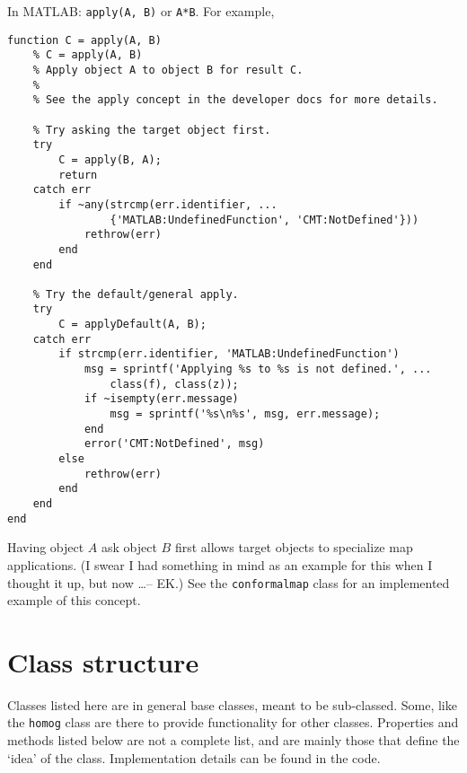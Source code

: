 \documentclass[12pt]{article}
\newcommand{\matlab}{MATLAB}
\begin{document}
\noindent In \matlab: \verb+apply(A, B)+ or \verb+A*B+. For example,
\begin{lstlisting}[frame=single]
function C = apply(A, B)
    % C = apply(A, B)
    % Apply object A to object B for result C.
    %
    % See the apply concept in the developer docs for more details.
    
    % Try asking the target object first.
    try
        C = apply(B, A);
        return
    catch err
        if ~any(strcmp(err.identifier, ...
                {'MATLAB:UndefinedFunction', 'CMT:NotDefined'}))
            rethrow(err)
        end
    end
    
    % Try the default/general apply.
    try
        C = applyDefault(A, B);
    catch err
        if strcmp(err.identifier, 'MATLAB:UndefinedFunction')
            msg = sprintf('Applying %s to %s is not defined.', ...
                class(f), class(z));
            if ~isempty(err.message)
                msg = sprintf('%s\n%s', msg, err.message);
            end
            error('CMT:NotDefined', msg)
        else
            rethrow(err)
        end
    end
end
\end{lstlisting}

Having object $A$ ask object $B$ first allows target objects to specialize map applications. (I swear I had something in mind as an example for this when I thought it up, but now \ldots -- EK.) See the \verb+conformalmap+ class for an implemented example of this concept.


\section{Class structure}
Classes listed here are in general base classes, meant to be sub-classed. Some, like the \verb+homog+ class are there to provide functionality for other classes. Properties and methods listed below are not a complete list, and are mainly those that define the `idea' of the class. Implementation details can be found in the code.
\end{document}
